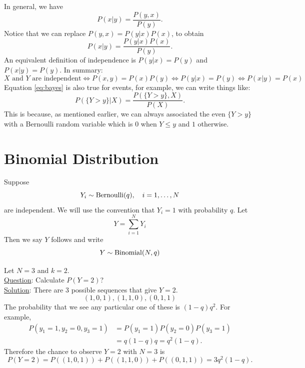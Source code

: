  In general, we have 
\begin{equation}
P(x|y) = \frac{P(y,x)}{P(y)}.
\end{equation}
Notice that we can replace $P(y,x) = P(y|x)P(x)$, to obtain 
\begin{equation}\label{eq:bayes}
P(x|y) = \frac{P(y|x)P(x)}{P(y)}.
\end{equation}
An equivalent definition of independence is $P(y|x)  = P(y)$ and $P(x|y) = P(y)$.  In summary: 
\begin{equation*}
\text{$X$ and $Y$ are independent} \iff P(x,y) = P(x)P(y) \iff P(y|x) = P(y) \iff P(x|y) = P(x)
\end{equation*}
Equation \eqref{eq:bayes} is also true for events, for example, we can write things like: 
\begin{equation}\label{eq:bayes}
P(\{Y>y\}|X) = \frac{P(\{Y>y\},X)}{P(X)}.
\end{equation}
This is because, as mentioned earlier, we can always associated the even $\{Y>y\}$ with a Bernoulli random variable which is $0$ when $Y \le y$ and $1$ otherwise. 



  \section{Binomial Distribution}
 Suppose 
  \begin{equation*}
  Y_i \sim {\rm Bernoulli}(q),\quad i =1,\dots, N
  \end{equation*} 
  are independent. We will use the convention that $Y_i=1$ with probability $q$. Let
\begin{equation*}
Y = \sum_{i=1}^N Y_i
\end{equation*}
 Then we say $Y$ follows  and write
\begin{equation*}
Y \sim {\rm Binomial}(N,q)
\end{equation*}

 
 
 \begin{example}
Let $N=3$ and $k=2$. \\

\noindent
\underline{Question}: Calculate $P(Y=2)$?\\

\noindent
\underline{Solution}: There are 3 possible sequences that give $Y=2$. 
\begin{equation*}
(1,0,1),(1,1,0),(0,1,1)
\end{equation*}
The probability that we see any particular one of these is $(1-q)q^2$. For example, 
\begin{align*}
P(y_1 = 1,y_2 = 0,y_3 = 1) &= P(y_1 = 1)P(y_2=0)P(y_3 =1) \\
&= q(1-q)q = q^2(1-q).
\end{align*}
Therefore the chance to observe $Y=2$ with $N=3$ is
\begin{equation*}
P(Y=2) = P((1,0,1)) +P((1,1,0))  + P((0,1,1))  =  3q^2(1-q). 
\end{equation*}


 \end{example}
 
